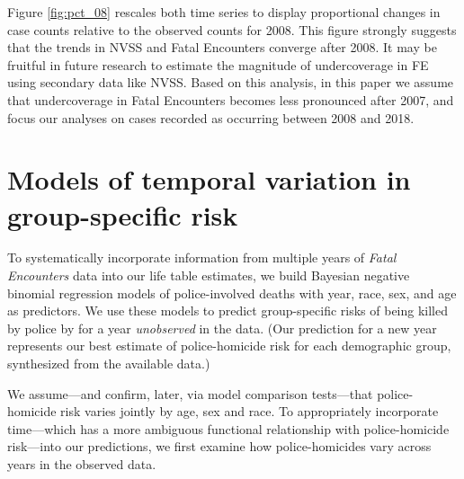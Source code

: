 \documentclass{article}
\begin{document}
Figure \ref{fig:pct_08} rescales both time series to display proportional changes in case counts relative to the observed counts for 2008. This figure strongly suggests that the trends in NVSS and Fatal Encounters converge after 2008. It may be fruitful in future research to estimate the magnitude of undercoverage in FE using secondary data like NVSS. Based on this analysis, in this paper we assume that undercoverage in Fatal Encounters becomes less pronounced after 2007, and focus our analyses on cases recorded as occurring between 2008 and 2018. 

\section{Models of temporal variation in group-specific risk}








To systematically incorporate information from multiple years of \textit{Fatal Encounters} data into our life table estimates, we build Bayesian negative binomial regression models of police-involved deaths with year, race, sex, and age as predictors. We use these models to predict group-specific risks of being killed by police by for a year \textit{unobserved} in the data. (Our prediction for a new year represents our best estimate of police-homicide risk for each demographic group, synthesized from the available data.) 

We assume---and confirm, later, via model comparison tests---that police-homicide risk varies jointly by age, sex and race. To appropriately incorporate time---which has a more ambiguous functional relationship with police-homicide risk---into our predictions, we first examine how police-homicides vary across years in the observed data.  
\end{document}
